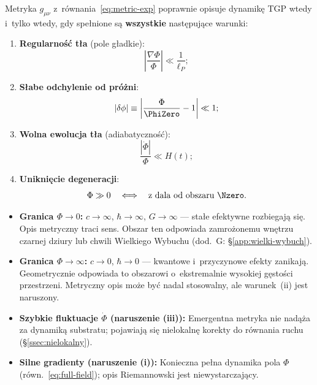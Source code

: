 \begin{proposition}\label{prop:metric-domain}
Metryka $g_{\mu\nu}$ z~r\'ownania~\eqref{eq:metric-exp} poprawnie
opisuje dynamik\k{e} TGP wtedy i~tylko wtedy, gdy spe\l{}nione s\k{a}
\textbf{wszystkie} nast\k{e}puj\k{a}ce warunki:
\begin{enumerate}[nosep,label=(\roman*)]
  \item \textbf{Regularno\'s\'c t\l{}a} (pole g\l{}adkie):
    \begin{equation}\label{eq:dom-smooth}
      \left|\frac{\nabla\Phi}{\Phi}\right| \ll \frac{1}{\ell_P};
    \end{equation}
  \item \textbf{S\l{}abe odchylenie od pr\'o\.zni}:
    \begin{equation}\label{eq:dom-weak}
      |\delta\phi| \equiv \left|\frac{\Phi}{\PhiZero} - 1\right| \ll 1;
    \end{equation}
  \item \textbf{Wolna ewolucja t\l{}a} (adiabatyczno\'s\'c):
    \begin{equation}\label{eq:dom-adiab}
      \frac{|\dot\Phi|}{\Phi} \ll H(t);
    \end{equation}
  \item \textbf{Unikni\k{e}cie degeneracji}:
    \begin{equation}\label{eq:dom-nondeg}
      \Phi \gg 0
      \quad\Longleftrightarrow\quad
      \text{z~dala od obszaru }\Nzero.
    \end{equation}
\end{enumerate}
\end{proposition}

\begin{remark}\label{rem:metric-limits}
\hfill
\begin{itemize}[nosep]
  \item \textbf{Granica $\Phi \to 0$:}
    $c \to \infty$, $\hbar \to \infty$, $G \to \infty$
    --- sta\l{}e efektywne rozbiegaj\k{a} si\k{e}. Opis metryczny
    traci sens. Obszar ten odpowiada zamro\.zonemu wnętrzu czarnej
    dziury lub chwili Wielkiego Wybuchu
    (dod.~G: \S\ref{app:wielki-wybuch}).

  \item \textbf{Granica $\Phi \to \infty$:}
    $c \to 0$, $\hbar \to 0$ --- kwantowe i~przyczynowe efekty
    zanikaj\k{a}. Geometrycznie odpowiada to obszarowi
    o~ekstremalnie wysokiej g\k{e}sto\'sci przestrzeni.
    Metryczny opis mo\.ze by\'c nadal stosowalny, ale
    warunek~(ii) jest naruszony.

  \item \textbf{Szybkie fluktuacje $\dot\Phi$ (naruszenie (iii)):}
    Emergentna metryka nie nad\k{a}\.za za dynamik\k{a} substratu;
    pojawiaj\k{a} si\k{e} nielokaln\k{e} korekty do r\'ownania
    ruchu (\S\ref{ssec:nielokalny}).

  \item \textbf{Silne gradienty (naruszenie (i)):}
    Konieczna pe\l{}na dynamika pola $\Phi$ (r\'own.~\eqref{eq:full-field});
    opis Riemannowski jest niewystarczaj\k{a}cy.
\end{itemize}
\end{remark}


